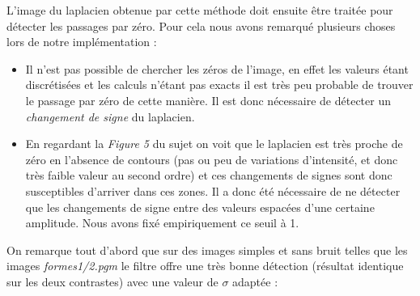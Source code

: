 \documentclass[a4,12pt]{article}
\begin{document}
L'image du laplacien obtenue par cette méthode doit ensuite être traitée pour détecter les passages par zéro. Pour cela nous avons remarqué plusieurs choses lors de notre implémentation :
\begin{itemize}
	\item Il n'est pas possible de chercher les zéros de l'image, en effet les valeurs étant discrétisées et les calculs n'étant pas exacts il est très peu probable de trouver le passage par zéro de cette manière. Il est donc nécessaire de détecter un \textit{changement de signe} du laplacien.
	\item En regardant la \textit{Figure 5} du sujet on voit que le laplacien est très proche de zéro en l'absence de contours (pas ou peu de variations d'intensité, et donc très faible valeur au second ordre) et ces changements de signes sont donc susceptibles d'arriver dans ces zones. Il a donc été nécessaire de ne détecter que les changements de signe entre des valeurs espacées d'une certaine amplitude. Nous avons fixé empiriquement ce seuil à 1.\\
\end{itemize}

On remarque tout d'abord que sur des images simples et sans bruit telles que les images \textit{formes1/2.pgm} le filtre offre une très bonne détection (résultat identique sur les deux contrastes) avec une valeur de $\sigma$ adaptée :\\
\end{document}
